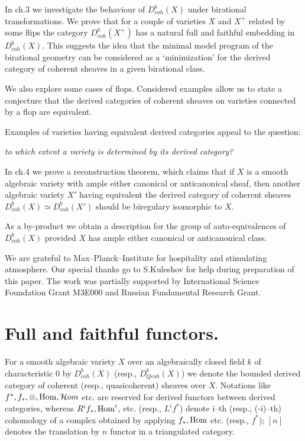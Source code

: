 \documentclass[12pt]{article}
\def\db#1{ D^b_{coh}({#1})}
\begin{document}
In ch.3 we investigate the behaviour of ${\db X}$ under birational transformations. We prove that for a couple of varieties $X$ and $X^+$ related by some flips the category ${\db {X^+}}$ has a natural full and faithful embedding in ${\db X}$. This suggests the idea that the minimal model program of the birational geometry can be considered as a `minimization' for the derived category of coherent sheaves in a given birational class. 

 We also explore some cases of flops. Considered examples allow us to state a conjecture that the derived categories of coherent sheaves on varieties connected by a flop are equivalent.

Examples of varieties having equivalent derived categories appeal to the question:

{\it to which extent a variety is determined by its derived category?}

In ch.4 we prove a reconstruction theorem, which claims that
if $X$ is a smooth algebraic variety with ample either canonical or anticanonical sheaf, then another algebraic variety $X'$ having equivalent the derived category of coherent sheaves ${\db X}\simeq {\db {X'}}$ should be biregulary isomorphic to $X$.

As a by-product we obtain a description for the group of
 auto-equivalences of ${\db X}$ provided $X$ has ample either canonical or anticanonical class.
 

We are grateful to Max--Planck--Institute for hospitality and stimulating atmosphere. Our special thanks go to 
S.Kuleshov for  help during preparation of this paper. The work was partially supported by International Science Foundation Grant M3E000 and Russian Fundamental Research Grant. 




















\section{Full and faithful functors.}


\hspace*{0.6cm}For a smooth algebraic variety  $X$ over an  algebraically closed field $k$ of characteristic $0$ by
 ${\db X}$ (resp., $D^b_{Qcoh}(X)$) we denote the bounded derived category of
coherent (resp., quasicoherent) sheaves over $X$. Notations like $f^{*}, f_{*},
\otimes, {\rm Hom}, {\cal H}om$ etc. are reserved for derived functors between derived categories, whereas $R^if_*, {\rm Hom}^i$, etc. (resp., $L^if^*$) denote i--th (resp., (-i)--th) cohomology of a complex obtained by applying $f_*, {\rm Hom}$ etc. (resp., $f^*$); $[n]$ denotes the translation by $n$ functor in a triangulated category.
\end{document}
